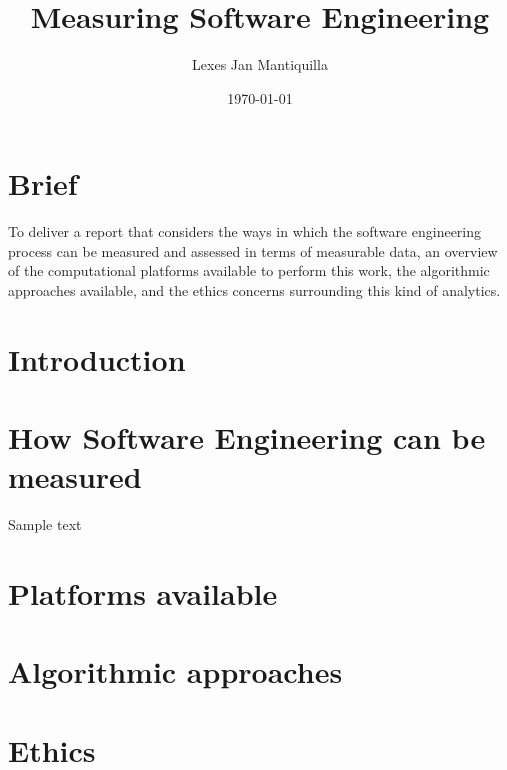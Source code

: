\documentclass{article}
\title{Measuring Software Engineering}
\author{Lexes Jan Mantiquilla}
\date{\today}
\begin{document}
\maketitle
\tableofcontents
\newpage

\section{Brief}
To deliver a report that considers the ways in which the software engineering
process can be measured and assessed in terms of measurable data, an overview
of the computational platforms available to perform this work, the algorithmic
approaches available, and the ethics concerns surrounding this kind of
analytics.

\section{Introduction}
\section{How Software Engineering can be measured}
Sample text~\cite{fenton1999software}
\section{Platforms available}
\section{Algorithmic approaches}
\section{Ethics}



\end{document}
